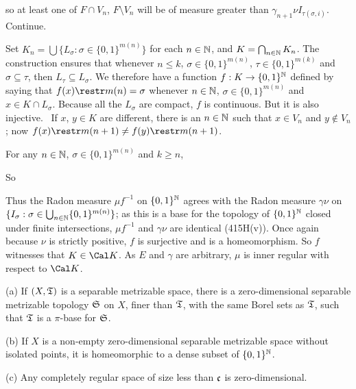 {\noindent so at least one of $F\cap V_n$, $F\setminus V_n$ will be of
measure greater than $\gamma_{n+1}\nu I_{\tau(\sigma,i)}$.
Continue.

Set $K_n=\bigcup\{L_{\sigma}:\sigma\in\{0,1\}^{m(n)}\}$ for each
$n\in\Bbb N$, and $K=\bigcap_{n\in\Bbb N}K_n$.
The construction ensures that whenever $n\le k$,
$\sigma\in\{0,1\}^{m(n)}$, $\tau\in\{0,1\}^{m(k)}$ and
$\sigma\subseteq\tau$, then $L_{\tau}\subseteq L_{\sigma}$.   We
therefore have a function $f:K\to\{0,1\}^{\Bbb N}$ defined by saying
that $f(x)\restr m(n)=\sigma$ whenever $n\in\Bbb N$,
$\sigma\in\{0,1\}^{m(n)}$ and $x\in K\cap L_{\sigma}$.   Because all the
$L_{\sigma}$ are compact, $f$ is continuous.   But it is also
injective.   \Prf\ If $x$, $y\in K$ are different, there is an
$n\in\Bbb N$ such that $x\in V_n$ and $y\notin V_n$;  now 
$f(x)\restr m(n+1)\ne f(y)\restr m(n+1)$.\ \Qed

For any $n\in\Bbb N$, $\sigma\in\{0,1\}^{m(n)}$ and $k\ge n$,


\noindent So


\noindent Thus the Radon measure $\mu f^{-1}$ on $\{0,1\}^{\Bbb N}$
agrees with the Radon measure $\gamma\nu$ on
$\{I_{\sigma}:\sigma\in\bigcup_{n\in\Bbb N}\{0,1\}^{m(n)}\}$;  as this
is a base for the topology of $\{0,1\}^{\Bbb N}$ closed under finite
intersections, $\mu f^{-1}$ and $\gamma\nu$ are identical (415H(v)).
Once again because $\nu$ is strictly positive, $f$ is surjective and is
a homeomorphism.   So $f$ witnesses that $K\in\Cal K$.
As $E$ and $\gamma$ are arbitrary, $\mu$ is inner regular with respect
to $\Cal K$.
}%

 (a) If $(X,\frak T)$ is a separable metrizable
space, there is a zero-dimensional separable metrizable topology
$\frak S$ on $X$, finer than $\frak T$, with the same Borel sets as
$\frak T$, such that $\frak T$ is a $\pi$-base for $\frak S$.

(b) If $X$ is a non-empty zero-dimensional separable metrizable space
without isolated points, it is homeomorphic to a dense subset of
$\{0,1\}^{\Bbb N}$.

(c) Any completely regular space of size less than $\frak c$
is zero-dimensional.

